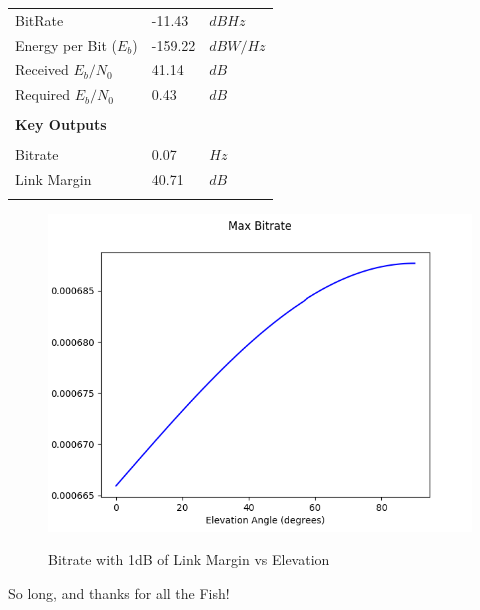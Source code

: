 \documentclass{article}
\begin{document}
\begin{center}
\begin{tabular}{p{3in}p{1in}l}
BitRate & -11.43 & $dBHz$ \\
Energy per Bit ($E_b$) & -159.22 & $dBW/Hz$ \\
Received $E_b/N_0$ & 41.14 & $dB$ \\
Required $E_b/N_0$ & 0.43 & $dB$ \\
\\
\textbf{Key Outputs} & & \\
\hline \\
Bitrate & 0.07 & $Hz$ \\
Link Margin & 40.71 & $dB$ \\
\\
\end{tabular}

  
  \begin{figure}
    \caption{Bitrate with 1dB of Link Margin vs Elevation}
    \includegraphics[width=\linewidth]{./max-bitrate.png}
    \label{fig::pfd::max-bitrate}
  \end{figure}
        
\end{center}

\newpage
So long, and thanks for all the Fish!

\end{document}
